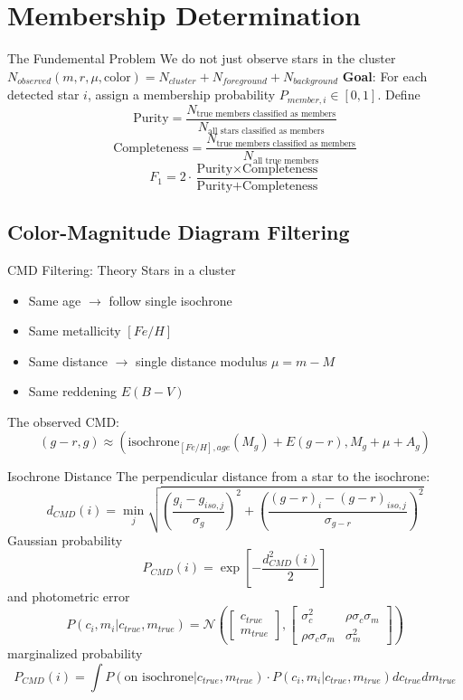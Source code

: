 \documentclass{beamer}
\begin{document}
\section{Membership Determination}
\begin{frame}{The Fundemental Problem}
    We do not just observe stars in the cluster
    $N_{observed}(m,r,\mu,\text{color})=N_{cluster}+N_{foreground}+N_{background}$
    \textbf{Goal}: For each detected star $i$, assign a membership probability $P_{member,i}\in [0,1]$. Define
    $$\text{Purity} = \frac{N_{\text{true members classified as members}}}{N_{\text{all stars classified as members}}}$$
    $$\text{Completeness} = \frac{N_{\text{true members classified as members}}}{N_{\text{all true members}}}$$
    $$F_1 = 2 \cdot \frac{\text{Purity} \times \text{Completeness}}{\text{Purity} + \text{Completeness}}$$
\end{frame}
\subsection{Color-Magnitude Diagram Filtering}
\begin{frame}{CMD Filtering: Theory}
    Stars in a cluster \cite{bressan2012,cardelli1989}
    \begin{itemize}
        \item Same age $\rightarrow$ follow single isochrone
        \item Same metallicity $[Fe/H]$
        \item Same distance $\rightarrow$ single distance modulus $\mu = m-M$
        \item Same reddening $E(B-V)$
    \end{itemize}
    The observed CMD:
    $$(g-r,g) \approx (\text{isochrone}_{[Fe/H],age}(M_g)+E(g-r),M_g+\mu+A_g)$$
\end{frame}
\begin{frame}{Isochrone Distance}
    The perpendicular distance from a star to the isochrone:
    $$d_{CMD}(i) = \min_j \sqrt{\left( \frac{g_i-g_{iso,j}}{\sigma_g}\right)^2 + \left( \frac{(g-r)_i-(g-r)_{iso,j}}{\sigma_{g-r}}\right)^2}$$
    Gaussian probability
    $$P_{CMD}(i)=\exp \left[ - \frac{d_{CMD}^2(i)}{2} \right]$$
    and photometric error
    $$P(c_i,m_i |c_{true},m_{true})=\mathcal{N} \left(  \begin{bmatrix}c_{true}\\m_{true}\end{bmatrix}, \begin{bmatrix}\sigma_c^2 & \rho\sigma_c\sigma_m\\ \rho\sigma_c\sigma_m & \sigma_m^2 \end{bmatrix} \right)$$
    marginalized probability
    $$P_{CMD}(i) = \int P(\text{on isochrone}|c_{true},m_{true})\cdot P(c_i, m_i | c_{true},m_{true})dc_{true}dm_{true}$$
\end{frame}
\end{document}
